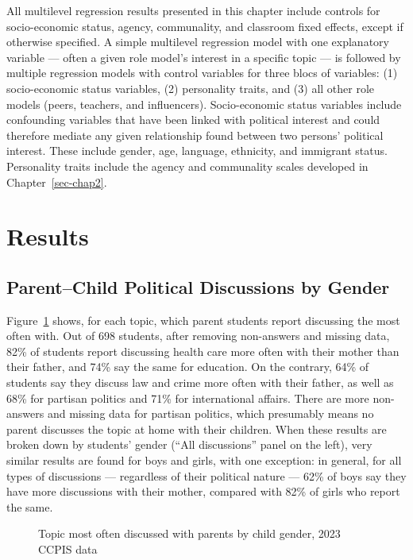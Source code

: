 \documentclass[
  letterpaper,
  DIV=11,
  numbers=noendperiod]{scrreprt}
\begin{document}
All multilevel regression results presented in this chapter include
controls for socio-economic status, agency, communality, and classroom
fixed effects, except if otherwise specified. A simple multilevel
regression model with one explanatory variable --- often a given role
model's interest in a specific topic --- is followed by multiple
regression models with control variables for three blocs of variables:
(1) socio-economic status variables, (2) personality traits, and (3) all
other role models (peers, teachers, and influencers). Socio-economic
status variables include confounding variables that have been linked
with political interest and could therefore mediate any given
relationship found between two persons' political interest. These
include gender, age, language, ethnicity, and immigrant status.
Personality traits include the agency and communality scales developed
in Chapter~\ref{sec-chap2}.

\section{Results}\label{results-1}

\subsection{Parent--Child Political Discussions by
Gender}\label{parentchild-political-discussions-by-gender}

Figure~\ref{fig-parents} shows, for each topic, which parent students
report discussing the most often with. Out of 698 students, after
removing non-answers and missing data, 82\% of students report
discussing health care more often with their mother than their father,
and 74\% say the same for education. On the contrary, 64\% of students
say they discuss law and crime more often with their father, as well as
68\% for partisan politics and 71\% for international affairs. There are
more non-answers and missing data for partisan politics, which
presumably means no parent discusses the topic at home with their
children. When these results are broken down by students' gender (``All
discussions'' panel on the left), very similar results are found for
boys and girls, with one exception: in general, for all types of
discussions --- regardless of their political nature --- 62\% of boys
say they have more discussions with their mother, compared with 82\% of
girls who report the same.

\begin{figure}


\caption{\label{fig-parents}Topic most often discussed with parents by
child gender, 2023 CCPIS data}

\end{figure}%
\end{document}
